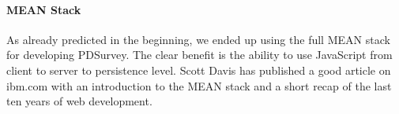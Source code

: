 		\paragraph{MEAN Stack}
		As already predicted in the beginning, we ended up using the full MEAN stack for developing PDSurvey. The clear benefit is the ability to use JavaScript from client to server to persistence level. Scott Davis has published a good article on ibm.com with an introduction to the MEAN stack and a short recap of the last ten years of web development\cite{Scott2014MEANStack}.



